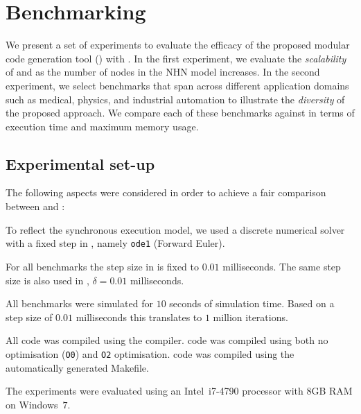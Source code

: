 \section{Benchmarking}
\label{sec:benchmarking}


We present a set of experiments to evaluate the efficacy of the proposed
modular code generation tool (\ourTool) with \simulink.  In the first 
experiment, we evaluate the \emph{scalability} of \ourTool and \simulink as the 
number of nodes in the \ac{NHN} model increases.  In the second experiment, we 
select benchmarks that span across different application domains such as 
medical, physics, and industrial automation to illustrate the \emph{diversity} 
of the proposed approach.  We compare each of these benchmarks against 
\simulink in terms of execution time and maximum memory usage.  


\subsection{Experimental set-up}
\label{sec:experimentalSetUp}
The following aspects were considered in order to achieve a fair
comparison between \ourTool and \simulink:

\begin{description}
\item[\textbf{Solver}] To reflect the synchronous execution model, we
  used a discrete numerical solver with a fixed step in \simulink,
  namely \texttt{ode1} (Forward Euler).
  
\item[\textbf{Step Size}] For all benchmarks the step size in \simulink
  is fixed to $0.01$ milliseconds.  The same step size is also used in
  \ourTool, $\delta = 0.01$ milliseconds.
  
\item[\textbf{Time}] All benchmarks were simulated for $10$ seconds of
  simulation time.  Based on a step size of $0.01$ milliseconds this
  translates to $1$ million iterations.
  
\item[\textbf{Compiler}] All code was compiled using the \compiler
  compiler.  \ourTool code was compiled using both no optimisation
  (\texttt{O0}) and \texttt{O2} optimisation.  \simulink code was
  compiled using the automatically generated Makefile.
\end{description}

The experiments were evaluated using an Intel~i7-4790 processor with
$8$GB RAM on Windows~$7$.


